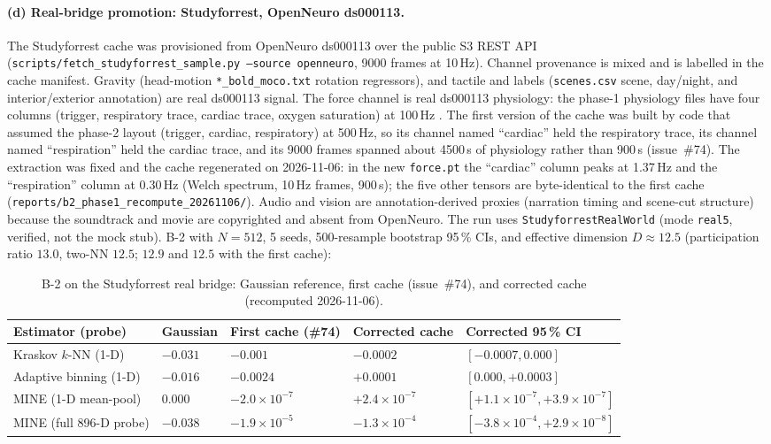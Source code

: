 \documentclass{article}
\begin{document}
\paragraph{(d) Real-bridge promotion: Studyforrest, OpenNeuro
ds000113.} The Studyforrest cache was provisioned from OpenNeuro
ds000113 over the public S3 REST API
(\texttt{scripts/fetch\_studyforrest\_sample.py --source openneuro},
9000 frames at 10\,Hz). Channel provenance is mixed and is labelled
in the cache manifest. Gravity (head-motion
\texttt{*\_bold\_moco.txt} rotation regressors), and tactile and
labels (\texttt{scenes.csv} scene, day/night, and interior/exterior
annotation) are real ds000113 signal. The force channel is real
ds000113 physiology: the phase-1 physiology files have four columns
(trigger, respiratory trace, cardiac trace, oxygen saturation) at
100\,Hz \citep[p.~11]{hanke2014}. The first version of the cache was
built by code that assumed the phase-2 layout (trigger, cardiac,
respiratory) at 500\,Hz, so its channel named ``cardiac'' held the
respiratory trace, its channel named ``respiration'' held the cardiac
trace, and its 9000 frames spanned about 4500\,s of physiology
rather than 900\,s (issue~\#74). The extraction was fixed and the
cache regenerated on 2026-11-06: in the new \texttt{force.pt} the
``cardiac'' column peaks at 1.37\,Hz and the ``respiration'' column at
0.30\,Hz (Welch spectrum, 10\,Hz frames, 900\,s); the five other
tensors are byte-identical to the first cache
(\texttt{reports/b2\_phase1\_recompute\_20261106/}). Audio and vision are
annotation-derived proxies (narration timing and scene-cut structure)
because the soundtrack and movie are copyrighted and absent from
OpenNeuro. The run uses \texttt{StudyforrestRealWorld} (mode
\texttt{real5}, verified, not the mock stub). B-2 with $N = 512$, 5
seeds, 500-resample bootstrap 95\,\% CIs, and effective dimension $D
\approx 12.5$ (participation ratio $13.0$, two-NN $12.5$; $12.9$ and
$12.5$ with the first cache):

\begin{table}[ht]
  \centering
  \caption{B-2 on the Studyforrest real bridge: Gaussian reference,
  first cache (issue~\#74), and corrected cache (recomputed 2026-11-06).}
  \label{tab:e1-studyforrest}
  \small
  \begin{tabular}{lllll}
    \toprule
    Estimator (probe) & Gaussian & First cache (\#74) & Corrected cache & Corrected 95\,\% CI \\
    \midrule
    Kraskov $k$-NN (1-D)    & $-0.031$ & $-0.001$ & $-0.0002$ & $[-0.0007, 0.000]$ \\
    Adaptive binning (1-D)  & $-0.016$ & $-0.0024$ & $+0.0001$ & $[0.000, +0.0003]$ \\
    MINE (1-D mean-pool)    & $0.000$  & $-2.0\times 10^{-7}$ & $+2.4\times 10^{-7}$ & $[+1.1\times 10^{-7}, +3.9\times 10^{-7}]$ \\
    MINE (full 896-D probe) & $-0.038$ & $-1.9\times 10^{-5}$ & $-1.3\times 10^{-4}$ & $[-3.8\times 10^{-4}, +2.9\times 10^{-8}]$ \\
    \bottomrule
  \end{tabular}
\end{table}
\end{document}
